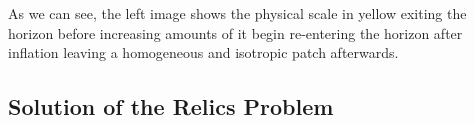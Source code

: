 \documentclass[a4paper,12pt,twoside]{report}
\begin{document}
\noindent%
\begin{minipage}{\linewidth}%
\label{Fig2.4}
\end{minipage}

As we can see, the left image shows the physical scale in yellow exiting the horizon before increasing amounts of it begin re-entering the horizon after inflation leaving a homogeneous and isotropic patch afterwards.

\subsection{Solution of the Relics Problem} \label{subsec:RelicProblem}
\end{document}
